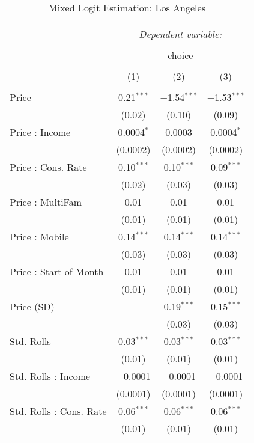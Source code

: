 
\begin{table}[!htbp] \centering 
  \caption{Mixed Logit Estimation: Los Angeles} 
  \label{tab:mnlLos AngelesRandCoef} 
\begin{tabular}{@{\extracolsep{5pt}}lccc} 
\\[-1.8ex]\hline 
\hline \\[-1.8ex] 
 & \multicolumn{3}{c}{\textit{Dependent variable:}} \\ 
\cline{2-4} 
\\[-1.8ex] & \multicolumn{3}{c}{choice} \\ 
\\[-1.8ex] & (1) & (2) & (3)\\ 
\hline \\[-1.8ex] 
 Price & 0.21$^{***}$ & $-$1.54$^{***}$ & $-$1.53$^{***}$ \\ 
  & (0.02) & (0.10) & (0.09) \\ 
  Price : Income & 0.0004$^{*}$ & 0.0003 & 0.0004$^{*}$ \\ 
  & (0.0002) & (0.0002) & (0.0002) \\ 
  Price : Cons. Rate & 0.10$^{***}$ & 0.10$^{***}$ & 0.09$^{***}$ \\ 
  & (0.02) & (0.03) & (0.03) \\ 
  Price : MultiFam & 0.01 & 0.01 & 0.01 \\ 
  & (0.01) & (0.01) & (0.01) \\ 
  Price : Mobile & 0.14$^{***}$ & 0.14$^{***}$ & 0.14$^{***}$ \\ 
  & (0.03) & (0.03) & (0.03) \\ 
  Price : Start of Month & 0.01 & 0.01 & 0.01 \\ 
  & (0.01) & (0.01) & (0.01) \\ 
  Price (SD) &  & 0.19$^{***}$ & 0.15$^{***}$ \\ 
  &  & (0.03) & (0.03) \\ 
  Std. Rolls & 0.03$^{***}$ & 0.03$^{***}$ & 0.03$^{***}$ \\ 
  & (0.01) & (0.01) & (0.01) \\ 
  Std. Rolls : Income & $-$0.0001 & $-$0.0001 & $-$0.0001 \\ 
  & (0.0001) & (0.0001) & (0.0001) \\ 
  Std. Rolls : Cons. Rate & 0.06$^{***}$ & 0.06$^{***}$ & 0.06$^{***}$ \\ 
  & (0.01) & (0.01) & (0.01) \\ 

\end{tabular}
\end{table}
